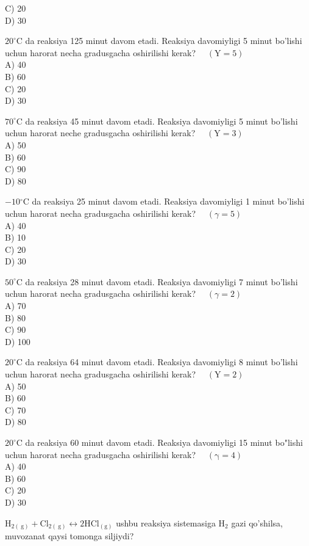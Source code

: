 C) 20\\
D) 30
  \item $20^{\circ} \mathrm{C}$ da reaksiya 125 minut davom etadi. Reaksiya davomiyligi 5 minut bo'lishi uchun harorat necha gradusgacha oshirilishi kerak? $\quad(\mathrm{Y}=5)$\\
A) 40\\
B) 60\\
C) 20\\
D) 30
  \item $70^{\circ} \mathrm{C}$ da reaksiya 45 minut davom etadi. Reaksiya davomiyligi 5 minut bo'lishi uchun harorat neche gradusgacha oshirilishi kerak? $\quad(\mathrm{Y}=3)$\\
A) 50\\
B) 60\\
C) 90\\
D) 80
  \item $-10{ }^{\circ} \mathrm{C}$ da reaksiya 25 minut davom etadi. Reaksiya davomiyligi 1 minut bo'lishi uchun harorat necha gradusgacha oshirilishi kerak? $\quad(\gamma=5)$\\
A) 40\\
B) 10\\
C) 20\\
D) 30
  \item $50^{\circ} \mathrm{C}$ da reaksiya 28 minut davom etadi. Reaksiya davomiyligi 7 minut bo'lishi uchun harorat necha gradusgacha oshirilishi kerak? $\quad(\gamma=2)$\\
A) 70\\
B) 80\\
C) 90\\
D) 100
  \item $20^{\circ} \mathrm{C}$ da reaksiya 64 minut davom etadi. Reaksiya davomiyligi 8 minut bo'lishi uchun harorat necha gradusgacha oshirilishi kerak? $\quad(\mathrm{Y}=2)$\\
A) 50\\
B) 60\\
C) 70\\
D) 80
  \item $20^{\circ} \mathrm{C}$ da reaksiya 60 minut davom etadi. Reaksiya davomiyligi 15 minut bo"lishi uchun harorat necha gradusgacha oshirilishi kerak? $\quad(\mathrm{\gamma}=4)$\\
A) 40\\
B) 60\\
C) 20\\
D) 30
  \item $\mathrm{H}_{2(\mathrm{~g})}+\mathrm{Cl}_{2(\mathrm{~g})} \leftrightarrow 2 \mathrm{HCl}_{(\mathrm{g})}$ ushbu reaksiya sistemasiga $\mathrm{H}_{2}$ gazi qo'shilsa, muvozanat qaysi tomonga siljiydi?\\
